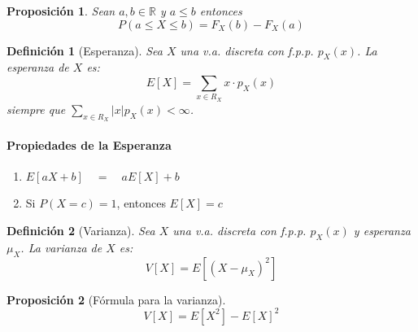 \documentclass{article}
\newtheorem{mydef}{Definici\'on}
\newtheorem{prop}{Proposici\'on}
\begin{document}
\begin{prop}
  Sean $a, b \in \mathbb{R} $ y $a \leq b$ entonces
  \[
    P(a \leq X \leq b) = F_X(b) - F_X(a)
  \]
\end{prop}

\begin{mydef}[Esperanza]
  Sea $X$ una v.a. discreta con f.p.p. $p_X(x)$. La \emph{esperanza}
  de $X$ es:
  \[
    E[X] = \sum_{x \in R_X} x \cdot p_X(x)
  \]
  siempre que \(\sum_{x \in R_X} |x|p_X(x) < \infty\).
\end{mydef}

\paragraph{Propiedades de la Esperanza}
\begin{enumerate}
\item \(E[aX+b] \quad = \quad aE[X]+b \)
\item Si $P(X = c) = 1$, entonces $E[X]= c$
\end{enumerate}

\begin{mydef}[Varianza]
  Sea $X$ una v.a. discreta con f.p.p. $p_X(x)$ y esperanza $\mu_X$.
  La \emph{varianza}  de $X$ es:
  \[
    V[X] = E[(X - \mu_X)^2]
  \]
\end{mydef}

\begin{prop}[F\'ormula para la varianza]
  \[
    V[X] = E[X^2] - E[X]^2
  \]
\end{prop}
\end{document}
